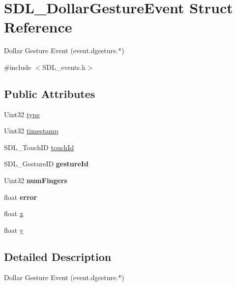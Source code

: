 \hypertarget{structSDL__DollarGestureEvent}{}\section{S\+D\+L\+\_\+\+Dollar\+Gesture\+Event Struct Reference}
\label{structSDL__DollarGestureEvent}


Dollar Gesture Event (event.\+dgesture.$\ast$)  




{\ttfamily \#include $<$S\+D\+L\+\_\+events.\+h$>$}

\subsection*{Public Attributes}
\begin{DoxyCompactItemize}
\item 
Uint32 \hyperlink{structSDL__DollarGestureEvent_ac7f6948754a1b2eb36edde043bf75ce9}{type}
\item 
Uint32 \hyperlink{structSDL__DollarGestureEvent_a3bccd8ebdf30b79c0f4074f6471ec583}{timestamp}
\item 
S\+D\+L\+\_\+\+Touch\+ID \hyperlink{structSDL__DollarGestureEvent_a40402f6911ed0dba48e6b23aa02bd83d}{touch\+Id}
\item 
\mbox{\label{structSDL__DollarGestureEvent_a68968438eae9e58208b14e8c954dec31}} 
S\+D\+L\+\_\+\+Gesture\+ID {\bfseries gesture\+Id}
\item 
\mbox{\label{structSDL__DollarGestureEvent_a14160d8bad8569f53dd18ed8f64d253f}} 
Uint32 {\bfseries num\+Fingers}
\item 
\mbox{\label{structSDL__DollarGestureEvent_a30aaa8fe0df93615e6692aa20e9c13eb}} 
float {\bfseries error}
\item 
float \hyperlink{structSDL__DollarGestureEvent_a9888449bd8842ed96494b4db16a6097b}{x}
\item 
float \hyperlink{structSDL__DollarGestureEvent_a293b2303acc1cfc63c167c5525e6eab5}{y}
\end{DoxyCompactItemize}


\subsection{Detailed Description}
Dollar Gesture Event (event.\+dgesture.$\ast$) 

